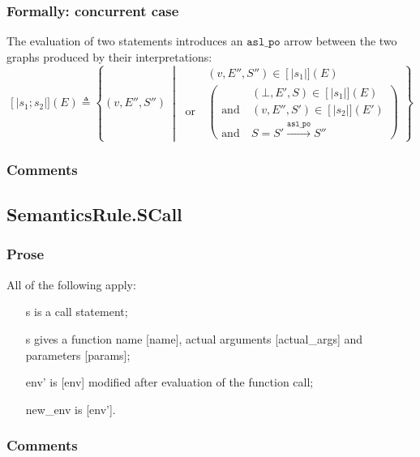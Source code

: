 \documentclass{book}
\newcommand\llbracket{[|}
\newcommand\rrbracket{|]}
\newcommand\interp[1]{\left\llbracket #1 \right\rrbracket}
\newcommand\st[0]{\ \middle|\ }
\newcommand\aslpo[0]{\mathtt{asl\_po}}
\begin{document}
  \subsubsection{Formally: concurrent case}
  The evaluation of two statements introduces an $\aslpo$ arrow between the two
graphs produced by their interpretations:
  \begin{equation}
    \interp{s_1; s_2} (E) \triangleq
      \left\{ (v, E'', S'') \st{}
      \begin{aligned}
        & (v, E'', S'') \in \interp{s_1} (E)
        \\ \text{or}\ &
        \left(
        \begin{aligned}
            & (\bot{}, E', S) \in \interp{s_1} (E)
            \\ \text{and}\ &
            (v, E'', S') \in \interp{s_2} (E')
            \\ \text{and}\ &
            S = S' \xrightarrow{\aslpo} S''
        \end{aligned}
        \right)
      \end{aligned}
      \right\}
    \label{eq:sem-ndet-sseq}
  \end{equation}

  \subsubsection{Comments}

\subsection{SemanticsRule.SCall \label{sec:SemanticsRule.SCall}}

    \subsubsection{Prose}
    All of the following apply:
    \begin{itemize}
    \item [s] is a call statement;
    \item [s] gives a function name [name], actual arguments [actual\_args] and
      parameters [params];
    \item [env'] is [env] modified after evaluation of the function call;
    \item [new\_env] is [env'].
    \end{itemize}

    \subsubsection{Comments}
\end{document}
